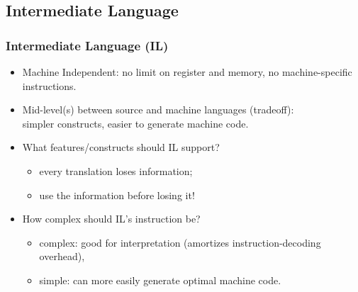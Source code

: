 \documentclass{beamer}
\renewcommand{\emph}[1]{\textcolor{structure}{#1}}
\newcommand{\emp}[1]{\textcolor{DikuRed}{ #1}}
\begin{document}
\subsection{Intermediate Language}

\begin{frame}
	\frametitle{Intermediate Language (\textsc{IL})}

\begin{itemize}

\item \emph{Machine Independent}: 
        no limit on register and memory, no machine-specific instructions.\bigskip

\item \emp{Mid-level(s)} between source and machine languages (\alert{tradeoff}):\\
                simpler constructs, easier to generate machine code.\bigskip

\item What features/constructs should \textsc{IL} support?\smallskip
    \begin{itemize}
        \item every translation loses information;\smallskip
        \item use the information before losing it!
    \end{itemize} \bigskip

\item How complex should \textsc{IL}'s instruction be?\smallskip
    \begin{itemize}
        \item complex: good for interpretation (amortizes instruction-decoding overhead),\smallskip
        \item simple: can more easily generate optimal machine code.\smallskip
    \end{itemize}

\end{itemize}
\end{frame}
\end{document}
